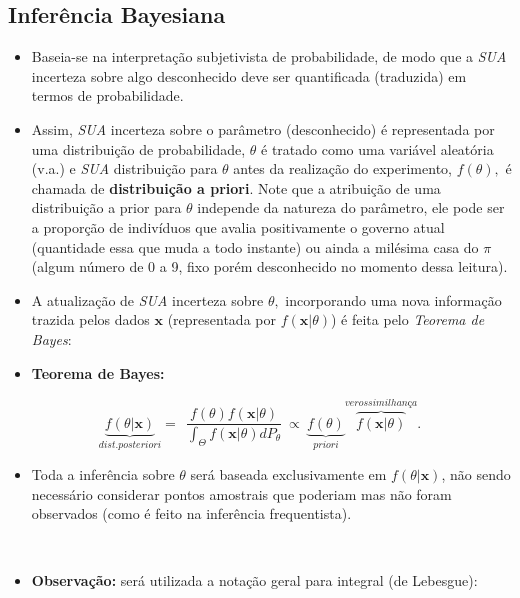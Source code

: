 \documentclass[
]{book}
\providecommand{\tightlist}{%
  \setlength{\itemsep}{0pt}\setlength{\parskip}{0pt}}
\begin{document}
\hypertarget{inferuxeancia-bayesiana}{%
\subsection{Inferência Bayesiana}\label{inferuxeancia-bayesiana}}

\begin{itemize}
\item
  Baseia-se na interpretação subjetivista de probabilidade, de modo que a \emph{SUA} incerteza sobre algo desconhecido deve ser quantificada (traduzida) em termos de probabilidade.
\item
  Assim, \emph{SUA} incerteza sobre o parâmetro (desconhecido) é representada por uma distribuição de probabilidade, \(\theta\) é tratado como uma variável aleatória (v.a.) e \emph{SUA} distribuição para \(\theta\) antes da realização do experimento, \(f(\theta),\) é chamada de \textbf{distribuição a priori}. Note que a atribuição de uma distribuição a prior para \(\theta\) independe da natureza do parâmetro, ele pode ser a proporção de indivíduos que avalia positivamente o governo atual (quantidade essa que muda a todo instante) ou ainda a milésima casa do \(\pi\) (algum número de 0 a 9, fixo porém desconhecido no momento dessa leitura).
\item
  A atualização de \emph{SUA} incerteza sobre \(\theta,\) incorporando uma nova informação trazida pelos dados \(\boldsymbol x\) (representada por \(f(\boldsymbol x| \theta)\)) é feita pelo \emph{Teorema de Bayes}:
\item
  \textbf{Teorema de Bayes:}
\end{itemize}

\[\underbrace{f(\theta| \boldsymbol x)}_{dist. posteriori}=~~\dfrac{f(\theta)f(\boldsymbol x|\theta)}{\displaystyle \int_{\Theta}f(\boldsymbol x|\theta)dP_\theta} ~\propto~ \underbrace{f(\theta)}_{priori}\overbrace{f(\boldsymbol x|\theta)}^{verossimilhança}.\]

\begin{itemize}
\tightlist
\item
  Toda a inferência sobre \(\theta\) será baseada exclusivamente em \(f(\theta| \boldsymbol x)\), não sendo necessário considerar pontos amostrais que poderiam mas não foram observados (como é feito na inferência frequentista).
\end{itemize}

\(~\)

\begin{itemize}
\tightlist
\item
  \textbf{Observação:} será utilizada a notação geral para integral (de Lebesgue):
\end{itemize}
\end{document}
